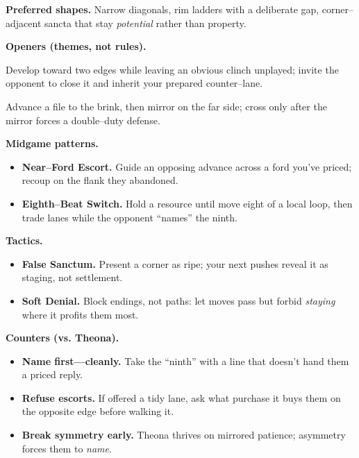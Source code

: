\documentclass[11pt]{article}
\begin{document}
\begin{itemize}
\medskip
\noindent\textbf{Preferred shapes.} Narrow diagonals, rim ladders with a deliberate gap, corner–adjacent sancta that stay \emph{potential} rather than property.

\medskip
\noindent\textbf{Openers (themes, not rules).}
\begin{description}\setlength\itemsep{0.35em}
  \item[\textit{Empty Chair.}] Develop toward two edges while leaving an obvious clinch unplayed; invite the opponent to close it and inherit your prepared counter–lane.
  \item[\textit{Unpoured Cup.}] Advance a file to the brink, then mirror on the far side; cross only after the mirror forces a double–duty defense.
\end{description}

\medskip
\noindent\textbf{Midgame patterns.}
\begin{itemize}\setlength\itemsep{0.25em}
  \item \textbf{Near–Ford Escort.} Guide an opposing advance across a ford you’ve priced; recoup on the flank they abandoned.
  \item \textbf{Eighth–Beat Switch.} Hold a resource until move eight of a local loop, then trade lanes while the opponent “names” the ninth.
\end{itemize}

\medskip
\noindent\textbf{Tactics.}
\begin{itemize}\setlength\itemsep{0.25em}
  \item \textbf{False Sanctum.} Present a corner as ripe; your next pushes reveal it as staging, not settlement.
  \item \textbf{Soft Denial.} Block endings, not paths: let moves pass but forbid \emph{staying} where it profits them most.
\end{itemize}

\medskip
\noindent\textbf{Counters (vs. Theona).}
\begin{itemize}\setlength\itemsep{0.25em}
  \item \textbf{Name first—cleanly.} Take the “ninth” with a line that doesn’t hand them a priced reply.
  \item \textbf{Refuse escorts.} If offered a tidy lane, ask what purchase it buys them on the opposite edge before walking it.
  \item \textbf{Break symmetry early.} Theona thrives on mirrored patience; asymmetry forces them to \emph{name}.
\end{itemize}


\end{itemize}
\end{document}
